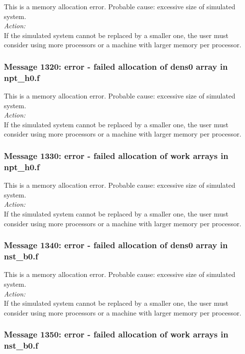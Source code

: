 This is a memory allocation error. Probable cause: excessive size of
simulated system. \\

\noindent
{\em Action:}\\
If the simulated system cannot be replaced by a smaller one, the user
must consider using more processors or a machine with larger memory
per processor.

\subsubsection*{Message 1320: error - failed allocation of dens0 array
in npt\_h0.f}

This is a memory allocation error. Probable cause: excessive size of
simulated system. \\

\noindent
{\em Action:}\\
If the simulated system cannot be replaced by a smaller one, the user
must consider using more processors or a machine with larger memory
per processor.

\subsubsection*{Message 1330: error - failed allocation of work arrays
in npt\_h0.f}

This is a memory allocation error. Probable cause: excessive size of
simulated system. \\

\noindent
{\em Action:}\\
If the simulated system cannot be replaced by a smaller one, the user
must consider using more processors or a machine with larger memory
per processor.

\subsubsection*{Message 1340: error - failed allocation of dens0 array
in nst\_b0.f}

This is a memory allocation error. Probable cause: excessive size of
simulated system. \\

\noindent
{\em Action:}\\
If the simulated system cannot be replaced by a smaller one, the user
must consider using more processors or a machine with larger memory
per processor.

\subsubsection*{Message 1350: error - failed allocation of work arrays
in nst\_b0.f}

